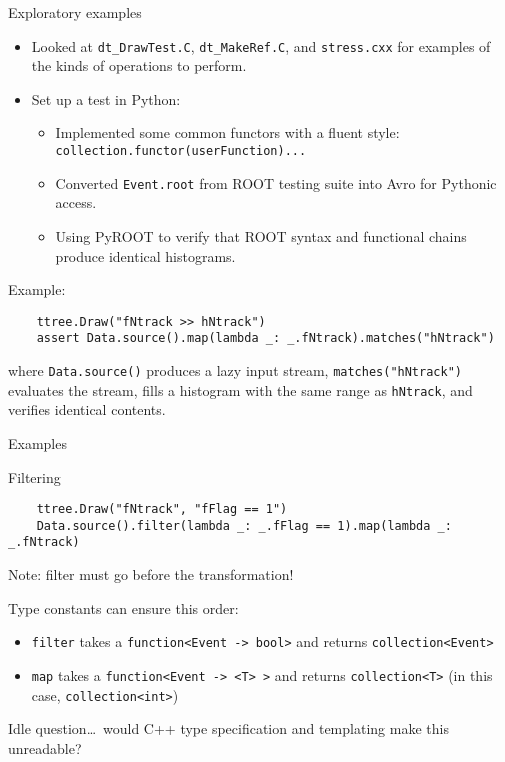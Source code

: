 \documentclass{beamer}
\begin{document}
\begin{frame}[fragile]{Exploratory examples}

\begin{itemize}
\item Looked at {\tt dt\_DrawTest.C}, {\tt dt\_MakeRef.C}, and {\tt stress.cxx} for examples of the kinds of operations to perform.
\item Set up a test in Python:
\begin{itemize}
\item Implemented some common functors with a fluent style: {\tt collection.functor(userFunction)...}
\item Converted {\tt Event.root} from ROOT testing suite into Avro for Pythonic access.
\item Using PyROOT to verify that ROOT syntax and functional chains produce identical histograms.
\end{itemize}
\end{itemize}

\begin{block}{Example:}
\vspace{-0.5\baselineskip}
{\scriptsize \begin{verbatim}
    ttree.Draw("fNtrack >> hNtrack")
    assert Data.source().map(lambda _: _.fNtrack).matches("hNtrack")
\end{verbatim}}

\vspace{-0.5\baselineskip}
where {\tt Data.source()} produces a lazy input stream, {\tt matches("hNtrack")} evaluates the stream, fills a histogram with the same range as {\tt hNtrack}, and verifies identical contents.
\end{block}
\end{frame}

\begin{frame}[fragile]{Examples}
\begin{block}{Filtering}
\vspace{-0.5\baselineskip}
{\scriptsize \begin{verbatim}
    ttree.Draw("fNtrack", "fFlag == 1")
    Data.source().filter(lambda _: _.fFlag == 1).map(lambda _: _.fNtrack)
\end{verbatim}}

Note: filter must go before the transformation!

\vspace{0.2 cm}
Type constants can ensure this order:
\begin{itemize}
\item {\tt filter} takes a {\tt function<Event -> bool>} and returns {\tt collection<Event>}
\item {\tt map} takes a {\tt function<Event -> <T> >} and returns {\tt collection<T>} (in this case, {\tt collection<int>})
\end{itemize}

\vspace{0.2 cm}
Idle question\ldots\ would C++ type specification and templating make this unreadable?
\end{block}
\end{frame}
\end{document}

